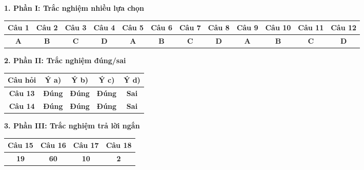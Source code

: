 \documentclass[12pt,a4paper]{article}
\begin{document}
\vspace{0.2cm}
\textbf{1. Phần I: Trắc nghiệm nhiều lựa chọn}
\begin{center}
{\setlength{\tabcolsep}{2.5pt}\small
\begin{tabular}{|c|c|c|c|c|c|c|c|c|c|c|c|}
\hline
\textbf{Câu 1} & \textbf{Câu 2} & \textbf{Câu 3} & \textbf{Câu 4} & \textbf{Câu 5} & \textbf{Câu 6} & \textbf{Câu 7} & \textbf{Câu 8} & \textbf{Câu 9} & \textbf{Câu 10} & \textbf{Câu 11} & \textbf{Câu 12} \\
\hline
\textbf{A} & \textbf{B} & \textbf{C} & \textbf{D} & \textbf{A} & \textbf{B} & \textbf{C} & \textbf{D} & \textbf{A} & \textbf{B} & \textbf{C} & \textbf{D} \\
\hline
\end{tabular}}
\end{center}

\vspace{0.2cm}
\textbf{2. Phần II: Trắc nghiệm đúng/sai}
\begin{center}
\begin{tabular}{|c|c|c|c|c|}
\hline
\textbf{Câu hỏi} & \textbf{Ý a)} & \textbf{Ý b)} & \textbf{Ý c)} & \textbf{Ý d)} \\
\hline
\textbf{Câu 13} & \textbf{Đúng} & \textbf{Đúng} & \textbf{Đúng} & \textbf{Sai} \\
\hline
\textbf{Câu 14} & \textbf{Đúng} & \textbf{Đúng} & \textbf{Đúng} & \textbf{Sai} \\
\hline
\end{tabular}
\end{center}

\vspace{0.2cm}
\textbf{3. Phần III: Trắc nghiệm trả lời ngắn}
\begin{center}
\begin{tabular}{|c|c|c|c|}
\hline
\textbf{Câu 15} & \textbf{Câu 16} & \textbf{Câu 17} & \textbf{Câu 18} \\
\hline
\textbf{19} & \textbf{60} & \textbf{10} & \textbf{2} \\
\hline
\end{tabular}
\end{center}
\end{document}
